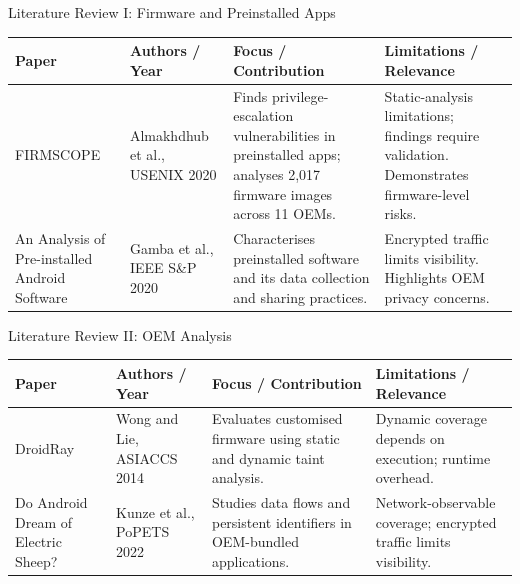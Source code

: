 \documentclass[aspectratio=169,10pt]{beamer}
\newcommand{\tbl}{\footnotesize\setlength{\tabcolsep}{3pt}\renewcommand{\arraystretch}{1.3}}
\begin{document}
\begin{frame}{Literature Review I: Firmware and Preinstalled Apps}

\begin{table}
\centering
\tbl

\begin{tabular}{|L{.18}|L{.15}|L{.31}|L{.28}|}
\hline

\textbf{Paper} &
\textbf{Authors / Year} &
\textbf{Focus / Contribution} &
\textbf{Limitations / Relevance}\\
\hline

FIRMSCOPE &
Almakhdhub et al., USENIX 2020 &
Finds privilege-escalation vulnerabilities in preinstalled apps; analyses 2,017 firmware images across 11 OEMs. &
Static-analysis limitations; findings require validation. Demonstrates firmware-level risks.\\
\hline

An Analysis of Pre-installed Android Software &
Gamba et al., IEEE S\&P 2020 &
Characterises preinstalled software and its data collection and sharing practices. &
Encrypted traffic limits visibility. Highlights OEM privacy concerns.\\
\hline

\end{tabular}
\end{table}

\end{frame}


\begin{frame}{Literature Review II: OEM Analysis}

\begin{table}
\centering
\tbl

\begin{tabular}{|L{.18}|L{.15}|L{.31}|L{.28}|}
\hline

\textbf{Paper} &
\textbf{Authors / Year} &
\textbf{Focus / Contribution} &
\textbf{Limitations / Relevance}\\
\hline

DroidRay &
Wong and Lie, ASIACCS 2014 &
Evaluates customised firmware using static and dynamic taint analysis. &
Dynamic coverage depends on execution; runtime overhead.\\
\hline

Do Android Dream of Electric Sheep? &
Kunze et al., PoPETS 2022 &
Studies data flows and persistent identifiers in OEM-bundled applications. &
Network-observable coverage; encrypted traffic limits visibility.\\
\hline

\end{tabular}
\end{table}

\end{frame}
\end{document}
